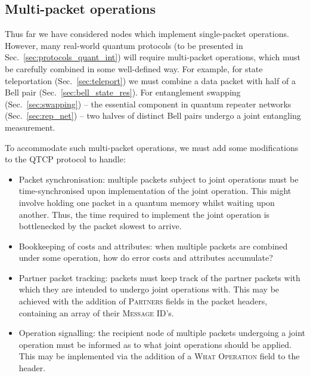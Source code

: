 %
%

\subsection{Multi-packet operations} 


Thus far we have considered nodes which implement single-packet operations. However, many real-world quantum protocols (to be presented in Sec.~\ref{sec:protocols_quant_int}) will require multi-packet operations, which must be carefully combined in some well-defined way. For example, for state teleportation (Sec.~\ref{sec:teleport}) we must combine a data packet with half of a Bell pair (Sec.~\ref{sec:bell_state_res}). For entanglement swapping (Sec.~\ref{sec:swapping}) -- the essential component in quantum repeater networks (Sec.~\ref{sec:rep_net}) -- two halves of distinct Bell pairs undergo a joint entangling measurement.

To accommodate such multi-packet operations, we must add some modifications to the QTCP protocol to handle:
\begin{itemize}
	\item Packet synchronisation: multiple packets subject to joint operations must be time-synchronised upon implementation of the joint operation. This might involve holding one packet in a quantum memory whilst waiting upon another. Thus, the time required to implement the joint operation is bottlenecked by the packet slowest to arrive.
	\item Bookkeeping of costs and attributes: when multiple packets are combined under some operation, how do error costs and attributes accumulate?
	\item Partner packet tracking: packets must keep track of the partner packets with which they are intended to undergo joint operations with. This may be achieved with the addition of \textsc{Partners} fields in the packet headers, containing an array of their \textsc{Message ID}'s.
	\item Operation signalling: the recipient node of multiple packets undergoing a joint operation must be informed as to what joint operations should be applied. This may be implemented via the addition of a \textsc{What Operation} field to the header.
\end{itemize}

